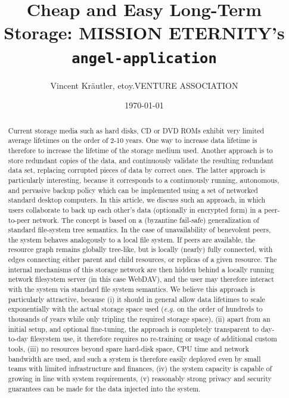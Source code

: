\documentclass[11pt]{article}
\title{Cheap and Easy Long-Term Storage: MISSION ETERNITY's \texttt{angel-application}}
\author{Vincent Kr\"autler, etoy.VENTURE ASSOCIATION}
\date{\today}                                           %
\begin{document}
\maketitle
\begin{frontmatter}

\begin{abstract}
Current storage media such as hard disks, CD or DVD ROMs exhibit very limited average lifetimes on the order of 2-10 years. One way to increase data lifetime is therefore to increase the lifetime of the storage medium used. Another approach is to store redundant copies of the data, and continuously validate the resulting redundant data set, replacing corrupted pieces of data by correct ones.
The latter approach is particularly interesting, because it corresponds to a continuously running, autonomous, and pervasive backup policy which can be implemented using a set of networked standard desktop computers. In this article, we discuss such an approach, in which users collaborate to back up each other's data (optionally in encrypted form) in a peer-to-peer network. The concept is based on a (byzantine fail-safe) generalization of standard file-system tree semantics. In the case of unavailability of benevolent peers, the system behaves analogously to a local file system. If peers are available, the resource graph remains globally tree-like, but is locally (nearly) fully connected, with edges connecting either parent and child resources, or replicas of a given resource. The internal mechanisms of this storage network are then hidden behind a locally running network filesystem server (in this case WebDAV), and the user may therefore interact with the system via standard file system semantics. We believe this approach is particularly attractive, because (i) it should in general allow data lifetimes to scale exponentially with the actual storage space used (\emph{e.g.} on the order of hundreds to thousands of years while only tripling the required storage space), (ii) apart from an initial setup, and optional fine-tuning, the approach is completely transparent to day-to-day filesystem use, it therefore requires no re-training or usage of additional custom tools, (iii) no resources beyond spare hard-disk space, CPU time and network bandwidth are used, and such a system is therefore easily deployed even by small teams with limited infrastructure and finances, (iv) the system capacity is capable of growing in line with system requirements, (v) reasonably strong privacy and security guarantees can be made for the data injected into the system.
\end{abstract}

\newpage

\tableofcontents


\end{frontmatter}
\end{document}

